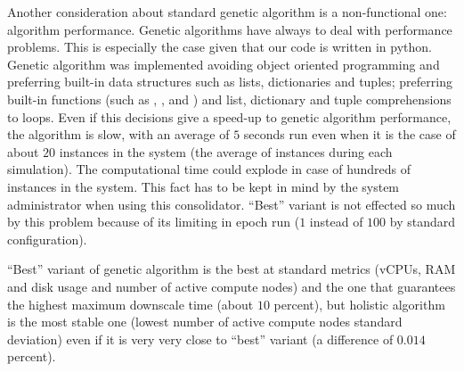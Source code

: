 Another consideration about standard genetic algorithm is a non-functional one: algorithm performance. Genetic algorithms have always to deal with performance problems. This is especially the case given that our code is written in python. Genetic algorithm was implemented avoiding object oriented programming and preferring built-in data structures such as lists, dictionaries and tuples; preferring built-in functions (such as , ,  and ) and list, dictionary and tuple comprehensions to  loops. Even if this decisions give a speed-up to genetic algorithm performance, the algorithm is slow, with an average of $5$ seconds run even when it is the case of about $20$ instances in the system (the average of instances during each simulation). The computational time could explode in case of hundreds of instances in the system. This fact has to be kept in mind by the system administrator when using this consolidator. ``Best'' variant is not effected so much by this problem because of its limiting in epoch run ($1$ instead of $100$ by standard configuration).

``Best'' variant of genetic algorithm is the best at standard metrics (vCPUs, RAM and disk usage and number of active compute nodes) and the one that guarantees the highest maximum downscale time (about $10$ percent), but holistic algorithm is the most stable one (lowest number of active compute nodes standard deviation) even if it is very very close to ``best'' variant (a difference of $0.014$ percent).
